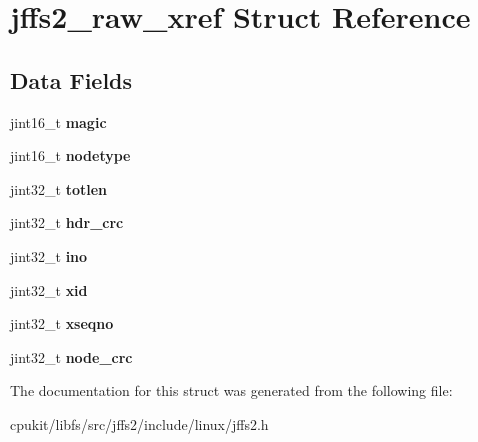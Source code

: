 \hypertarget{structjffs2__raw__xref}{}\section{jffs2\+\_\+raw\+\_\+xref Struct Reference}
\label{structjffs2__raw__xref}
\subsection*{Data Fields}
\begin{DoxyCompactItemize}
\item 
\mbox{\label{structjffs2__raw__xref_ae39a47c360244103eb36eb3b4cd1ed87}} 
jint16\+\_\+t {\bfseries magic}
\item 
\mbox{\label{structjffs2__raw__xref_ab7d12a46d09b0162f9e5d2a5e2b5885e}} 
jint16\+\_\+t {\bfseries nodetype}
\item 
\mbox{\label{structjffs2__raw__xref_afaca9d8d6cd764778222657f3c5482bf}} 
jint32\+\_\+t {\bfseries totlen}
\item 
\mbox{\label{structjffs2__raw__xref_a10d0839af7bef42d4f10372d8ac5fa37}} 
jint32\+\_\+t {\bfseries hdr\+\_\+crc}
\item 
\mbox{\label{structjffs2__raw__xref_ac4982a0a564f78be0d29ed44a59a1c58}} 
jint32\+\_\+t {\bfseries ino}
\item 
\mbox{\label{structjffs2__raw__xref_a365094c3a6341802d445ad6b1e1a9d9a}} 
jint32\+\_\+t {\bfseries xid}
\item 
\mbox{\label{structjffs2__raw__xref_a19dfa18ca52fa656ab8bfec707e5de48}} 
jint32\+\_\+t {\bfseries xseqno}
\item 
\mbox{\label{structjffs2__raw__xref_a92492afbe428949f09af01c537d6caa5}} 
jint32\+\_\+t {\bfseries node\+\_\+crc}
\end{DoxyCompactItemize}


The documentation for this struct was generated from the following file\+:\begin{DoxyCompactItemize}
\item 
cpukit/libfs/src/jffs2/include/linux/jffs2.\+h\end{DoxyCompactItemize}
